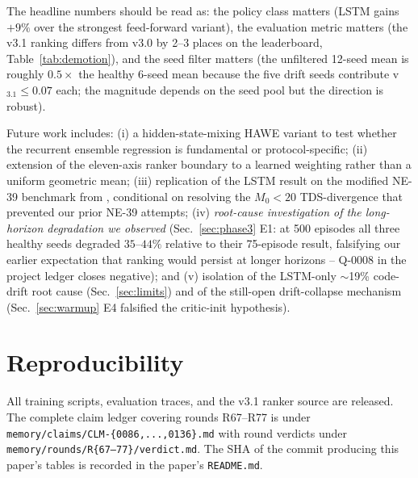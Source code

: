 \documentclass[journal,onecolumn,11pt]{IEEEtran}
\begin{document}
The headline numbers should be read as: the policy class matters
(LSTM gains $+9\%$ over the strongest feed-forward variant), the
evaluation metric matters (the v3.1 ranking differs from v3.0 by
2--3 places on the leaderboard, Table~\ref{tab:demotion}), and the
seed filter matters (the unfiltered 12-seed mean is roughly
$0.5\times$ the healthy 6-seed mean because the five drift seeds
contribute v$_{3.1} \leq 0.07$ each; the magnitude depends on the
seed pool but the direction is robust).

Future work includes: (i) a hidden-state-mixing HAWE variant to
test whether the recurrent ensemble regression is fundamental or
protocol-specific; (ii) extension of the eleven-axis ranker
boundary to a learned weighting rather than a uniform geometric
mean; (iii) replication of the LSTM result on the modified NE-39
benchmark from \cite[Sec.~IV-G]{yang2023ddic}, conditional on
resolving the $M_0 < 20$ TDS-divergence that prevented our prior
NE-39 attempts; (iv) \emph{root-cause investigation of the
long-horizon degradation we observed} (Sec.~\ref{sec:phase3} E1: at
500 episodes all three healthy seeds degraded $35$--$44\%$
relative to their 75-episode result, falsifying our earlier
expectation that ranking would persist at longer horizons --
Q-0008 in the project ledger closes negative); and (v) isolation
of the LSTM-only $\sim$19\% code-drift root cause
(Sec.~\ref{sec:limits}) and of the still-open drift-collapse
mechanism (Sec.~\ref{sec:warmup} E4 falsified the critic-init
hypothesis).

\section*{Reproducibility}

All training scripts, evaluation traces, and the v3.1 ranker source
are released. The complete claim ledger covering rounds R67--R77 is
under \texttt{memory/claims/CLM-\{0086,...,0136\}.md} with round
verdicts under \texttt{memory/rounds/R\{67--77\}/verdict.md}. The
SHA of the commit producing this paper's tables is recorded in the
paper's \texttt{README.md}.



\end{document}
